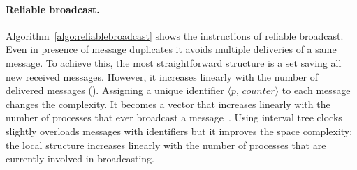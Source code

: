 \paragraph{Reliable broadcast.} Algorithm~\ref{algo:reliablebroadcast} shows the
instructions of reliable broadcast. Even in presence of message duplicates it
avoids multiple deliveries of a same message. To achieve this, the most
straightforward structure is a set saving all new received messages. However, it
increases linearly with the number of delivered messages (\REF). Assigning a
unique identifier $\langle p,\, counter \rangle$ to each message changes the
complexity. It becomes a vector that increases linearly with the number of
processes that ever broadcast a message~\cite{fidge1988timestamps}. Using
interval tree clocks~\cite{almeida2008interval} slightly overloads messages with
identifiers but it improves the space complexity: the local structure increases
linearly with the number of processes that are currently involved in
broadcasting.




